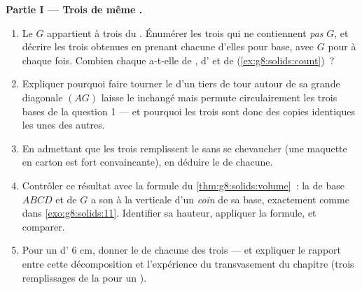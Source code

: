 \begin{problem}
\medskip
\noindent\textbf{Partie I --- Trois  de même .}
\begin{enumerate}
  \item Le  $G$ appartient à trois  du . Énumérer les
        trois  qui ne contiennent \emph{pas} $G$, et décrire
        les trois  obtenues en prenant chacune d'elles pour
        base, avec $G$ pour  à chaque fois. Combien chaque
         a-t-elle de , d' et de 
        (\cref{ex:g8:solids:count})~?
  \item Expliquer pourquoi faire tourner le  d'un tiers de tour
        autour de sa grande diagonale $(AG)$ laisse le 
        inchangé mais permute circulairement les trois bases de la
        question 1 --- et pourquoi les trois  sont donc des
        copies identiques les unes des autres.
  \item En admettant que les trois  remplissent le 
        sans se chevaucher (une maquette en carton est fort
        convaincante), en déduire le  de chacune.
  \item Contrôler ce résultat avec la formule du
        \cref{thm:g8:solids:volume}~: la  de base $ABCD$ et
        de  $G$ a son  à la verticale d'un \emph{coin}
        de sa base, exactement comme dans
        \cref{exo:g8:solids:11}. Identifier sa hauteur, appliquer la
        formule, et comparer.
  \item Pour un  d' $6$ cm, donner le  de chacune des
        trois  --- et expliquer le rapport entre cette
        décomposition et l'expérience du transvasement du chapitre
        (trois remplissages de la  pour un ).
\end{enumerate}


\end{problem}
